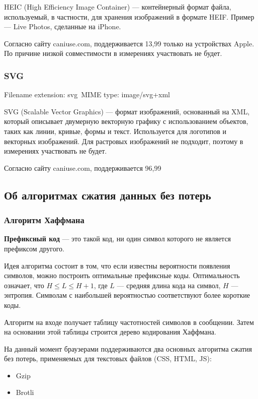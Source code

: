 \documentclass[12pt]{article}
\begin{document}
HEIC (High Efficiency Image Container) — контейнерный формат файла,
используемый, в частности, для хранения изображений в формате HEIF.
Пример — Live Photos, сделанные на iPhone.

Согласно сайту caniuse.com, поддерживается 13,99%
только на устройствах Apple. По причине низкой совместимости в измерениях участвовать не будет.

\subsubsection{SVG}
Filename extension: svg\
MIME type: image/svg+xml

SVG (Scalable Vector Graphics) — формат изображений, основанный на XML,
который описывает двумерную векторную графику с использованием объектов,
таких как линии, кривые, формы и текст. Используется для логотипов и векторных изображений.
Для растровых изображений не подходит, поэтому в измерениях участвовать не будет.

Согласно сайту caniuse.com, поддерживается 96,99%

\subsection{Об алгоритмах сжатия данных без потерь}

\subsubsection{Алгоритм Хаффмана}

\textbf{Префиксный код} — это такой код, ни один символ которого не является префиксом другого.

Идея алгоритма состоит в том, что если известны вероятности появления символов,
можно построить оптимальные префиксные коды. Оптимальность
означает, что $H \leq L \leq H + 1$, где $L$ — средняя длина кода на символ, $H$ — энтропия.
Символам с наибольшей вероятностью соответствуют более короткие коды.

Алгоритм на входе получает таблицу частотностей символов в сообщении.
Затем на основании этой таблицы строится дерево кодирования Хаффмана.

На данный момент браузерами поддерживаются два основных алгоритма сжатия без потерь,
применяемых для текстовых файлов (CSS, HTML, JS):

\begin{itemize}
\item Gzip
\item Brotli
\end{itemize}
\end{document}

